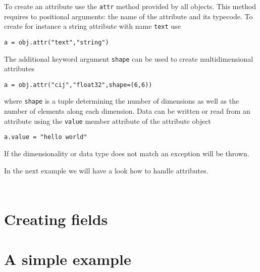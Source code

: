 To create an attribute use the {\tt attr} method provided by all objects. 
This method requires to positional arguments: the name of the attribute and its 
typecode. To create for instance a string attribute with name {\tt text} use
\begin{verbatim}
a = obj.attr("text","string")
\end{verbatim}
The additional keyword argument {\tt shape} can be used to create
multidimensional attributes
\begin{verbatim}
a = obj.attr("cij","float32",shape=(6,6))
\end{verbatim}
where {\tt shape} is a tuple determining the number of dimensions as well as the
number of elements along each dimension.
Data can be written or read from an attribute using the {\tt value} member
attribute of the attribute object
\begin{verbatim}
a.value = "hello world"
\end{verbatim}
If the dimensionality or data type does not match an exception will be thrown. 


In the next example we will have a look how to handle attributes.
\inputminted[linenos=true]{python}{../examples/nxgroup_ex2.py}
\inputminted[linenos=true]{python}{../examples/nxgroup_ex3.py}

\section{Creating fields}

\section{A simple example}
\inputminted[linenos=true]{python}{../examples/simple_io.py}

